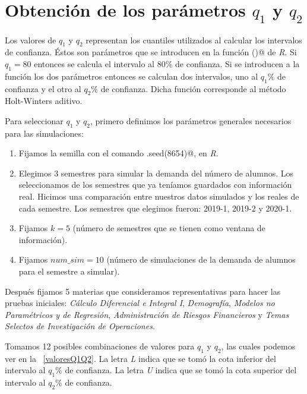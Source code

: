 \section{Obtención de los parámetros $q_{1}$ y $q_{2}$}

Los valores de $q_{1}$ y $q_{2}$ representan los cuantiles utilizados al calcular los intervalos de confianza. Éstos son parámetros que se introducen en la función \verb@hw()@ de \textit{R}. Si $q_{1} = 80$ entonces se calcula el intervalo al $80\%$ de confianza. Si se introducen a la función los dos parámetros entonces se calculan dos intervalos, uno al $q_{1}\%$ de confianza y el otro al $q_{2}\%$ de confianza. Dicha función corresponde al método Holt-Winters aditivo.

Para seleccionar $q_{1}$ y $q_{2}$, primero definimos los parámetros generales necesarios para las simulaciones:
  
  \begin{enumerate}
\item Fijamos la semilla con el comando \verb@set.seed(8654)@, en \textit{R}.

\item Elegimos 3 semestres para simular la demanda del número de alumnos. Los seleccionamos de los semestres que ya teníamos guardados con información real. Hicimos una comparación entre nuestros datos simulados y los reales de cada semestre. Los semestres que elegimos fueron: 2019-1, 2019-2 y 2020-1.

\item Fijamos $k = 5$ (número de semestres que se tienen como ventana de información).

\item Fijamos $num\_sim = 10$ (número de simulaciones de la demanda de alumnos para el semestre a simular).
\end{enumerate}


Después fijamos 5 materias que consideramos representativas para hacer las pruebas iniciales: \textit{Cálculo Diferencial e Integral I}, \textit{Demografía}, \textit{Modelos no Paramétricos y de Regresión}, \textit{Administración de Riesgos Financieros} y \textit{Temas Selectos de Investigación de Operaciones}.

Tomamos 12 posibles combinaciones de valores para $q_{1}$ y $q_{2}$, las cuales podemos ver en la \tablename{~\ref{valoresQ1Q2}}. La letra \textit{L} indica que se tomó la cota inferior del intervalo al $q_{1}\%$ de confianza. La letra \textit{U} indica que se tomó la cota superior del intervalo al $q_{2}\%$ de confianza.

